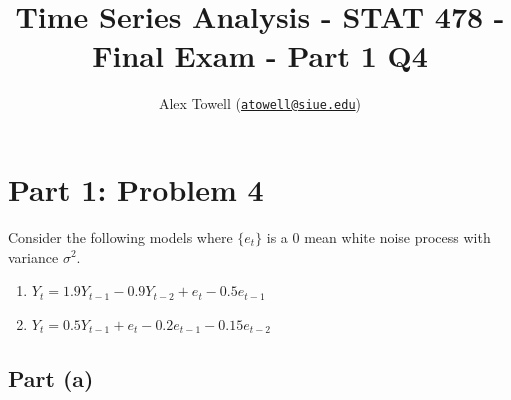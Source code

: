 \documentclass[
]{article}
\title{Time Series Analysis - STAT 478 - Final Exam - Part 1 Q4}
\author{Alex Towell
(\href{mailto:atowell@siue.edu}{\nolinkurl{atowell@siue.edu}})}
\date{}
\begin{document}
\maketitle

\hypertarget{part-1-problem-4}{%
\section{Part 1: Problem 4}\label{part-1-problem-4}}

Consider the following models where \(\{e_t\}\) is a \(0\) mean white
noise process with variance \(σ^2\).

\begin{enumerate}
\item [i] $Y_t = 1.9 Y_{t−1} − 0.9 Y_{t−2} + e_t − 0.5e_{t−1}$
\item [ii] $Y_t = 0.5 Y_{t−1} + e_t − 0.2e_{t−1} − 0.15e_{t−2}$
\end{enumerate}

\hypertarget{part-a}{%
\subsection{Part (a)}\label{part-a}}

\end{document}
